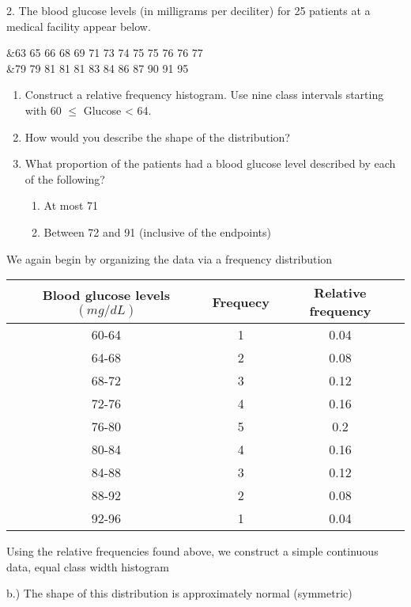 \documentclass{report}
\begin{document}
    \pagebreak 
    \begin{mdframed}
        2. The blood glucose levels (in milligrams per deciliter) for 25 patients at a medical facility appear below.
        \bigbreak \noindent 
        \begin{center}
            &63 65 66 68 69 71 73 74 75 75 76 76 77 \\
            &79 79 81 81 81 83 84 86 87 90 91 95
        \end{center}
        \bigbreak \noindent 
        \begin{enumerate}[label=(\alph*)]
            \item  Construct a relative frequency histogram. Use nine class intervals starting with 60 $\leq$ Glucose < 64. 
            \item How would you describe the shape of the distribution?
            \item What proportion of the patients had a blood glucose level described by each of the following? 
                \begin{enumerate}[label=(\roman*)]
                    \item At most 71
                    \item  Between 72 and 91 (inclusive of the endpoints)
                \end{enumerate}
        \end{enumerate}
    \end{mdframed}
    \bigbreak \noindent 
    We again begin by organizing the data via a frequency distribution
    \bigbreak \noindent 
    \begin{center}
        \begin{tabular}{c|c|c}
            Blood glucose levels $(mg/dL)$ & Frequecy & Relative frequency \\
            \hline
            60-64 & 1 &0.04\\
            64-68 & 2 &0.08\\
            68-72 & 3 &0.12\\
            72-76 & 4 &0.16\\
            76-80 & 5 &0.2\\
            80-84 & 4 &0.16\\
            84-88 & 3 &0.12\\
            88-92 & 2 &0.08\\
            92-96 & 1 & 0.04
        \end{tabular}
    \end{center}
    \pagebreak \bigbreak \noindent 
    Using the relative frequencies found above, we construct a simple continuous data, equal class width histogram 
    \bigbreak \noindent 
\begin{figure}[ht]
    \centering
    \label{fig:histo23}
\end{figure}
\bigbreak \noindent 
b.) The shape of this distribution is approximately normal (symmetric)
\end{document}

